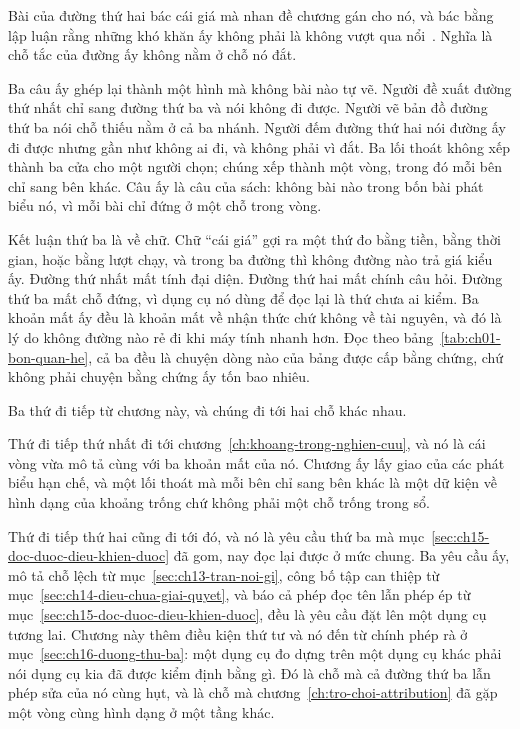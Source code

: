 Bài của đường thứ hai bác cái giá mà nhan đề chương gán cho nó, và bác bằng lập
luận rằng những khó khăn ấy không phải là không vượt qua
nổi~\autocite{p24humangap}. Nghĩa là chỗ tắc của đường ấy không nằm ở chỗ nó
đắt.

%
Ba câu ấy ghép lại thành một hình mà không bài nào tự vẽ. Người đề xuất đường
thứ nhất chỉ sang đường thứ ba và nói không đi được. Người vẽ bản đồ đường thứ
ba nói chỗ thiếu nằm ở cả ba nhánh. Người đếm đường thứ hai nói đường ấy đi
được nhưng gần như không ai đi, và không phải vì đắt. Ba lối thoát không xếp
thành ba cửa cho một người chọn; chúng xếp thành một vòng, trong đó mỗi bên chỉ
sang bên khác. Câu ấy là câu của sách: không bài nào trong bốn bài phát biểu nó,
vì mỗi bài chỉ đứng ở một chỗ trong vòng.

%
Kết luận thứ ba là về chữ. Chữ \enquote{cái giá} gợi ra một thứ đo bằng tiền,
bằng thời gian, hoặc bằng lượt chạy, và trong ba đường thì không đường nào trả
giá kiểu ấy. Đường thứ nhất mất tính đại diện. Đường thứ hai mất chính câu hỏi.
Đường thứ ba mất chỗ đứng, vì dụng cụ nó dùng để đọc lại là thứ chưa ai kiểm.
Ba khoản mất ấy đều là khoản mất về nhận thức chứ không về tài nguyên, và đó là
lý do không đường nào rẻ đi khi máy tính nhanh hơn. Đọc theo
bảng~\ref{tab:ch01-bon-quan-he}, cả ba đều là chuyện dòng nào của bảng được cấp
bằng chứng, chứ không phải chuyện bằng chứng ấy tốn bao nhiêu.

%
Ba thứ đi tiếp từ chương này, và chúng đi tới hai chỗ khác nhau.

Thứ đi tiếp thứ nhất đi tới chương~\ref{ch:khoang-trong-nghien-cuu}, và nó là cái vòng
vừa mô tả cùng với ba khoản mất của nó. Chương ấy lấy giao của các phát biểu hạn
chế, và một lối thoát mà mỗi bên chỉ sang bên khác là một dữ kiện về hình dạng
của khoảng trống chứ không phải một chỗ trống trong sổ.

Thứ đi tiếp thứ hai cũng đi tới đó, và nó là yêu cầu thứ ba mà
mục~\ref{sec:ch15-doc-duoc-dieu-khien-duoc} đã gom, nay đọc lại được ở mức
chung. Ba yêu cầu ấy, mô tả chỗ lệch từ mục~\ref{sec:ch13-tran-noi-gi}, công bố
tập can thiệp từ mục~\ref{sec:ch14-dieu-chua-giai-quyet}, và báo cả phép đọc tên
lẫn phép ép từ mục~\ref{sec:ch15-doc-duoc-dieu-khien-duoc}, đều là yêu cầu đặt
lên một dụng cụ tương lai. Chương này thêm điều kiện thứ tư và nó đến từ chính
phép rà ở mục~\ref{sec:ch16-duong-thu-ba}: một dụng cụ đo dựng trên một dụng cụ
khác phải nói dụng cụ kia đã được kiểm định bằng gì. Đó là chỗ mà cả đường thứ
ba lẫn phép sửa của nó cùng hụt, và là chỗ mà
chương~\ref{ch:tro-choi-attribution} đã gặp một vòng cùng hình dạng ở một tầng
khác.


